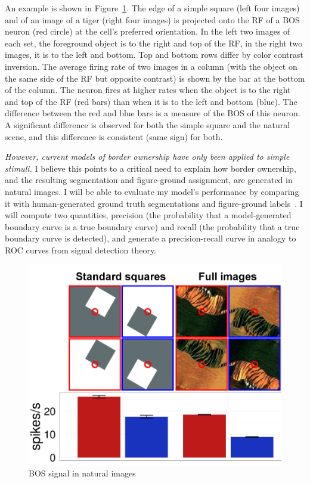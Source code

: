 \documentclass[11pt,notitlepage]{article}
\begin{document}
An example is shown in Figure~\ref{fig:NaturalImages}. The edge of a simple square (left four images) and of
an image of a tiger (right four images) is projected onto the RF of a
BOS neuron (red circle) at the cell's preferred orientation. In the
left two images of each set, the foreground object is to the right and
top of the RF, in the right two images, it is to the left and
bottom. Top and bottom rows differ by color contrast inversion. The
average firing rate of two images in a column (with the object on the
same side of the RF but opposite contrast) is shown by the bar at the
bottom of the column. The neuron fires at higher rates when the object
is to the right and top of the RF (red bars) than when it is to the
left and bottom (blue). The difference between the red and blue bars
is a measure of the BOS of
this neuron. A significant difference is observed for both the simple
square and the natural scene, and this difference is consistent (same
sign) for both.

{\em However, current models of  border ownership
  have only been applied to simple stimuli.}  I believe this points to
a critical need to explain how border ownership, and the resulting
segmentation and figure-ground assignment, are generated in natural
images. I will be able to evaluate my model's performance by comparing
it with human-generated ground truth segmentations and figure-ground
labels~\citep{Martin_etal01}. I will compute two quantities, precision
(the probability that a model-generated boundary curve is a true
boundary curve) and recall (the probability that a true boundary curve
is detected), and generate a precision-recall curve in analogy to ROC
curves from signal detection theory.

\begin{figure}
  \vspace{-30pt}
  \centering 
  \includegraphics[width=.4\textwidth]{figs/bos_naturalimages_clipped}
  \caption{BOS signal in natural images} 
  \vspace{-15pt}
  \label{fig:NaturalImages}
\end{figure}
\end{document}
